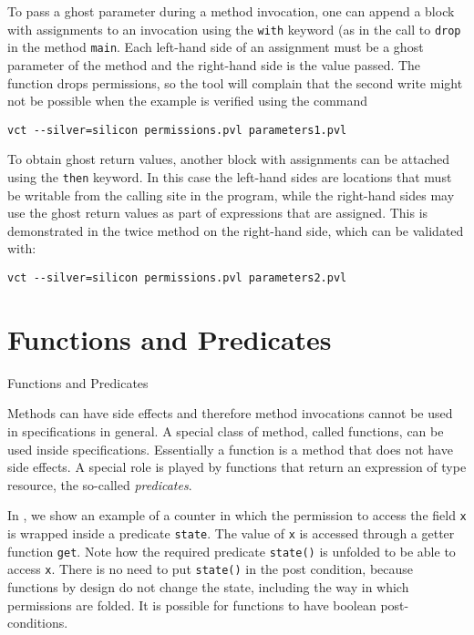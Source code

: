 To pass a ghost parameter during a method invocation,
one can append a block with assignments to an invocation
using the \lstinline+with+ keyword (as in the call to \lstinline+drop+
in the method \lstinline+main+. Each left-hand side
of an assignment must be a ghost parameter of the method
and the right-hand side is the value passed.
The function drops permissions, so the tool will complain
that the second write might not be possible when
the example is verified using the command

\begin{verbatim}
vct --silver=silicon permissions.pvl parameters1.pvl
\end{verbatim}

To obtain ghost return values, another block with assignments
can be attached using the \lstinline+then+ keyword.
In this case the left-hand sides are locations that must be writable
from the calling site in the program, while the right-hand sides
may use the ghost return values as part of expressions
that are assigned. This is demonstrated in the twice method
on the right-hand side, which can be validated with:

\begin{verbatim}
vct --silver=silicon permissions.pvl parameters2.pvl
\end{verbatim}

\section{Functions and Predicates}

\begin{listing}

\caption{Functions and Predicates}
\label{functions and predicates}
\end{listing}

Methods can have side effects and therefore method invocations
cannot be used in specifications in general. A special class
of method, called functions, can be used inside specifications.
Essentially a function is a method that does not have side effects. A special role is played by functions
that return an expression of type resource, the so-called \emph{predicates}.

In , we show an example of
a counter in which the permission to access the field \lstinline+x+
is wrapped inside a predicate \lstinline+state+.
The value of \lstinline+x+ is accessed through a getter 
function \lstinline+get+. Note how the required predicate \lstinline+state()+
is unfolded to be able to access \lstinline+x+. There is no need to
put \lstinline+state()+ in the post condition, because functions by design do not
change the state, including the way in which permissions are folded.
It is possible for functions to have boolean post-conditions.

